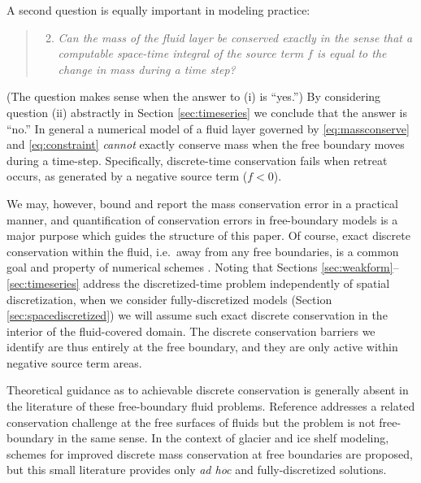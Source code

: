 \documentclass[final,onefignum]{siamart190516}
\begin{document}
A second question is equally important in modeling practice:
  \begin{quote}
  \renewcommand{\labelenumi}{(\roman{enumi})}
  \begin{enumerate}
  \setcounter{enumi}{1}
  \item \emph{Can the mass of the fluid layer be conserved exactly in the sense that a computable space-time integral of the source term $f$ is equal to the change in mass during a time step?}
  \end{enumerate}
  \end{quote}
(The question makes sense when the answer to (i) is ``yes.'')  By considering question (ii) abstractly in Section \ref{sec:timeseries} we conclude that the answer is ``no.''  In general a numerical model of a fluid layer governed by \eqref{eq:massconserve} and \eqref{eq:constraint} \emph{cannot} exactly conserve mass when the free boundary moves during a time-step.  Specifically, discrete-time conservation fails when retreat occurs, as generated by a negative source term ($f<0$).

We may, however, bound and report the mass conservation error in a practical manner, and quantification of conservation errors in free-boundary models is a major purpose which guides the structure of this paper.  Of course, exact discrete conservation within the fluid, i.e.~away from any free boundaries, is a common goal and property of numerical schemes \cite[and references therein]{LeVeque2002}.  Noting that Sections \ref{sec:weakform}--\ref{sec:timeseries} address the discretized-time problem independently of spatial discretization, when we consider fully-discretized models (Section \ref{sec:spacediscretized}) we will assume such exact discrete conservation in the interior of the fluid-covered domain.  The discrete conservation barriers we identify are thus entirely at the free boundary, and they are only active within negative source term areas.

Theoretical guidance as to achievable discrete conservation is generally absent in the literature of these free-boundary fluid problems.  Reference \cite{IdelsohnOnate2010} addresses a related conservation challenge at the free surfaces of fluids but the problem is not free-boundary in the same sense.  In the context of glacier \cite{JaroschSchoofAnslow2013} and ice shelf \cite{Albrechtetal2011} modeling, schemes for improved discrete mass conservation at free boundaries are proposed, but this small literature provides only \emph{ad hoc} and fully-discretized solutions.
\end{document}
